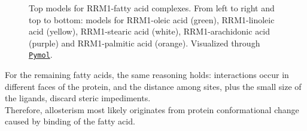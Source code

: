 \begin{figure}[htbp!]
    \endminipage
    \caption[Top models for RRM1-fatty acid complexes.]{Top models for RRM1-fatty acid complexes. From left to right and top to bottom: models for RRM1-oleic acid (green), RRM1-linoleic acid (yellow), RRM1-stearic acid (white), RRM1-arachidonic acid (purple) and RRM1-palmitic acid (orange). Visualized through \href{https://pymol.org/2/}{\texttt{Pymol}}.}
    \label{fig:complexesFinal}
\end{figure}

For the remaining fatty acids, the same reasoning holds: interactions occur in different faces of the protein, and the distance among sites, plus the small size of the ligands, discard steric impediments.\\

Therefore, allosterism most likely originates from protein conformational change caused by binding of the fatty acid.
